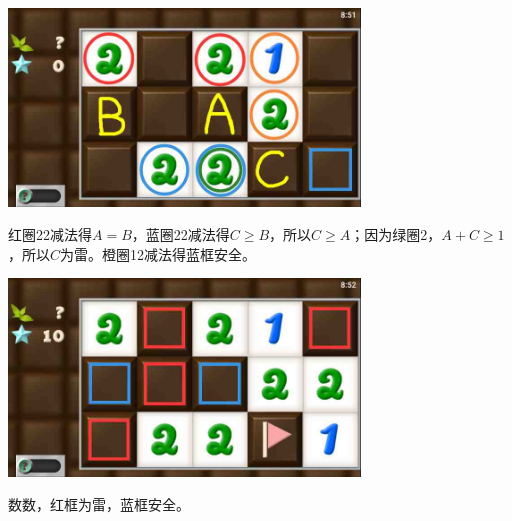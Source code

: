 \subsection{} %
\begin{center}
    \includegraphics[width=0.7\textwidth]{puzzlelow/112-1.jpg}
\end{center}
红圈22减法得$A=B$，蓝圈22减法得$C\ge B$，所以$C\ge A$；因为绿圈2，$A+C\ge 1$，所以$C$为雷。橙圈12减法得蓝框安全。
\begin{center}
    \includegraphics[width=0.7\textwidth]{puzzlelow/112-2.jpg}
\end{center}
数数，红框为雷，蓝框安全。

